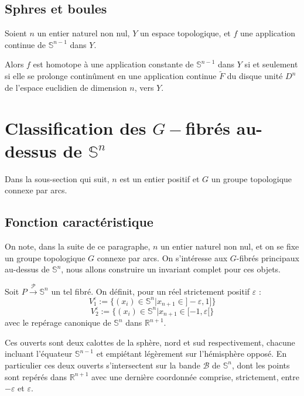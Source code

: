 \subsection{Sphres et boules}

\begin{prop}\label{hsd}
Soient $n$ un entier naturel non nul, $Y$ un espace topologique, et $f$ une application continue de $\mathbb{S}^{n-1}$ dans $Y$.

\par
Alors $f$ est homotope à une application constante de $\mathbb{S}^{n-1}$ dans $Y$ si et seulement si %
elle se prolonge continûment en une application continue $\tilde{F}$ du disque unité $D^n$ de l'espace euclidien de dimension $n$, vers $Y$.
\end{prop}

\section{Classification des $G-$fibr\'es au-dessus de $\mathbb{S}^n$}

Dans la sous-section qui suit, $n$ est un entier positif et $G$ un groupe topologique connexe par arcs.

\subsection{Fonction caract\'eristique}
%

On note, dans la suite de ce paragraphe, $n$ un entier naturel non nul, et on se fixe un groupe topologique $G$ connexe par arcs. %
On s'intéresse aux $G$-fibrés principaux au-dessus de $\mathbb{S}^n$, nous allons construire un invariant complet pour ces objets.

\par
Soit $P \xrightarrow{\mathcal{P}} \mathbb{S}^n$ un tel fibré. On définit, pour un réel strictement positif $\varepsilon$ :
\[
V_1^{\varepsilon} := \{(x_i) \in \mathbb{S}^n | x_{n+1} \in ]-\varepsilon , 1]\}%
\]
%
\[
V_2^{\varepsilon} := \{(x_i) \in \mathbb{S}^n | x_{n+1} \in [-1,\varepsilon [ \}%
\]
avec le repérage canonique de $\mathbb{S}^n$ dans $\mathbb{R}^{n+1}$.

\par
Ces ouverts sont deux calottes de la sphère, nord et sud respectivement, %
chacune incluant l'équateur $\mathbb{S}^{n-1}$ et empiétant légèrement sur l'hémisphère opposé. %
En particulier ces deux ouverts s'intersectent sur la bande $\mathcal{B}$ de $\mathbb{S}^n$, %
dont les points sont repérés dans $\mathbb{R}^{n+1}$ avec une dernière coordonnée comprise, strictement, entre $-\varepsilon$ et $\varepsilon$.

